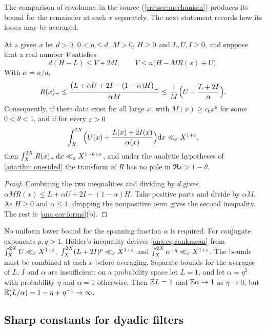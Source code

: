 The comparison of covolumes in the source (\cref{src:sec:mechanism}) produces its bound for
the remainder at each $x$ separately. The next statement records how its losses may be
averaged.

\begin{proposition}\label{ana:prop:rankloss}
At a given $x$ let $d>0$, $0<n\le d$, $M>0$, $H\ge0$ and $L,U,I\ge0$, and suppose that a real
number $V$ satisfies
\[
 d(H-L)\le V+2dI,\qquad V\le n\bigl(H-MR(x)+U\bigr).
\]
With $\alpha=n/d$,
\begin{equation}\label{ana:eq:rank}
 R(x)_+\le\frac{\bigl(L+\alpha U+2I-(1-\alpha)H\bigr)_+}{\alpha M}
 \le\frac1M\Bigl(U+\frac{L+2I}{\alpha}\Bigr).
\end{equation}
Consequently, if these data exist for all large $x$, with $M(x)\ge c_0x^{\theta}$ for some
$0<\theta<1$, and if for every $\varepsilon>0$
\begin{equation}\label{ana:eq:rankmean}
 \int_X^{2X}\Bigl(U(x)+\frac{L(x)+2I(x)}{\alpha(x)}\Bigr)\mathrm{d} x\ll_\varepsilon X^{1+\varepsilon},
\end{equation}
then $\int_X^{2X}R(x)_+\,\mathrm{d} x\ll_\varepsilon X^{1-\theta+\varepsilon}$, and under the analytic hypotheses of
\cref{ana:thm:onesided} the transform of $R$ has no pole in $\Re s>1-\theta$.
\end{proposition}

\begin{proof}
Combining the two inequalities and dividing by $d$ gives
$\alpha MR(x)\le L+\alpha U+2I-(1-\alpha)H$. Take positive parts and divide by $\alpha M$. As
$H\ge0$ and $\alpha\le1$, dropping the nonpositive term gives the second inequality. The rest
is \cref{ana:cor:forms}(b).
\end{proof}

No uniform lower bound for the spanning fraction $\alpha$ is required. For conjugate exponents
$p,q>1$, H\"older's inequality derives \eqref{ana:eq:rankmean} from
$\int_X^{2X}U\ll_\varepsilon X^{1+\varepsilon}$, $\int_X^{2X}(L+2I)^p\ll_\varepsilon X^{1+\varepsilon}$ and
$\int_X^{2X}\alpha^{-q}\ll_\varepsilon X^{1+\varepsilon}$. The bounds must be combined at each $x$ before
averaging. Separate bounds for the averages of $L$, $I$ and $\alpha$ are insufficient: on a
probability space let $L=1$, and let $\alpha=\eta^2$ with probability $\eta$ and $\alpha=1$
otherwise. Then $\mathbb{E} L=1$ and $\mathbb{E}\alpha\to1$ as $\eta\to0$, but
$\mathbb{E}(L/\alpha)=1-\eta+\eta^{-1}\to\infty$.

\subsection{Sharp constants for dyadic filters}\label{ana:sec:dyadic}
{\raggedright{}}

